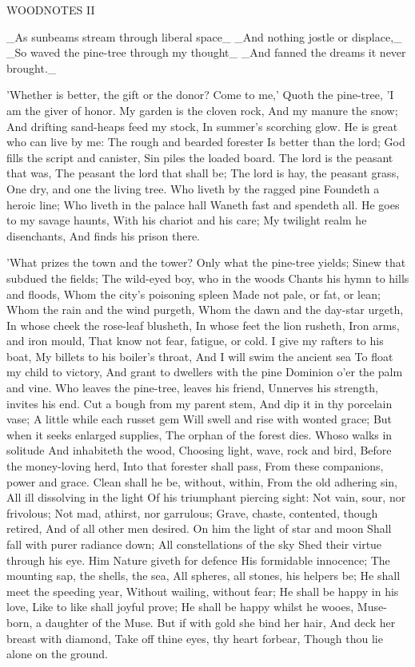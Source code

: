 WOODNOTES II

_As sunbeams stream through liberal space_
_And nothing jostle or displace,_
_So waved the pine-tree through my thought_
_And fanned the dreams it never brought._

'Whether is better, the gift or the donor?
Come to me,'
Quoth the pine-tree,
'I am the giver of honor.
My garden is the cloven rock,
And my manure the snow;
And drifting sand-heaps feed my stock,
In summer's scorching glow.
He is great who can live by me:
The rough and bearded forester
Is better than the lord;
God fills the script and canister,
Sin piles the loaded board.
The lord is the peasant that was,
The peasant the lord that shall be;
The lord is hay, the peasant grass,
One dry, and one the living tree.
Who liveth by the ragged pine
Foundeth a heroic line;
Who liveth in the palace hall
Waneth fast and spendeth all.
He goes to my savage haunts,
With his chariot and his care;
My twilight realm he disenchants,
And finds his prison there.

'What prizes the town and the tower?
Only what the pine-tree yields;
Sinew that subdued the fields;
The wild-eyed boy, who in the woods
Chants his hymn to hills and floods,
Whom the city's poisoning spleen
Made not pale, or fat, or lean;
Whom the rain and the wind purgeth,
Whom the dawn and the day-star urgeth,
In whose cheek the rose-leaf blusheth,
In whose feet the lion rusheth,
Iron arms, and iron mould,
That know not fear, fatigue, or cold.
I give my rafters to his boat,
My billets to his boiler's throat,
And I will swim the ancient sea
To float my child to victory,
And grant to dwellers with the pine
Dominion o'er the palm and vine.
Who leaves the pine-tree, leaves his friend,
Unnerves his strength, invites his end.
Cut a bough from my parent stem,
And dip it in thy porcelain vase;
A little while each russet gem
Will swell and rise with wonted grace;
But when it seeks enlarged supplies,
The orphan of the forest dies.
Whoso walks in solitude
And inhabiteth the wood,
Choosing light, wave, rock and bird,
Before the money-loving herd,
Into that forester shall pass,
From these companions, power and grace.
Clean shall he be, without, within,
From the old adhering sin,
All ill dissolving in the light
Of his triumphant piercing sight:
Not vain, sour, nor frivolous;
Not mad, athirst, nor garrulous;
Grave, chaste, contented, though retired,
And of all other men desired.
On him the light of star and moon
Shall fall with purer radiance down;
All constellations of the sky
Shed their virtue through his eye.
Him Nature giveth for defence
His formidable innocence;
The mounting sap, the shells, the sea,
All spheres, all stones, his helpers be;
He shall meet the speeding year,
Without wailing, without fear;
He shall be happy in his love,
Like to like shall joyful prove;
He shall be happy whilst he wooes,
Muse-born, a daughter of the Muse.
But if with gold she bind her hair,
And deck her breast with diamond,
Take off thine eyes, thy heart forbear,
Though thou lie alone on the ground.

